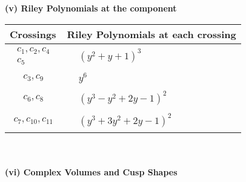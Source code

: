 \documentclass[1p]{elsarticle_modified}
\theoremstyle{definition}
\begin{document}
\newpage\renewcommand{\arraystretch}{1}
\flushleft \textbf{(v) Riley Polynomials at the component}\newline \\
\begin{tabular}{m{50pt}|m{274pt}}
Crossings & \hspace{64pt}Riley Polynomials at each crossing \\
\hline $$\begin{aligned}c_{1},c_{2},c_{4}\\c_{5}\end{aligned}$$&$\begin{aligned}
&(y^2+y+1)^3
\end{aligned}$\\
\hline $$\begin{aligned}c_{3},c_{9}\end{aligned}$$&$\begin{aligned}
&y^6
\end{aligned}$\\
\hline $$\begin{aligned}c_{6},c_{8}\end{aligned}$$&$\begin{aligned}
&(y^3- y^2+2 y-1)^2
\end{aligned}$\\
\hline $$\begin{aligned}c_{7},c_{10},c_{11}\end{aligned}$$&$\begin{aligned}
&(y^3+3 y^2+2 y-1)^2
\end{aligned}$\\
\hline
\end{tabular}\\~\\
\newpage\flushleft \textbf{(vi) Complex Volumes and Cusp Shapes}
\end{document}
